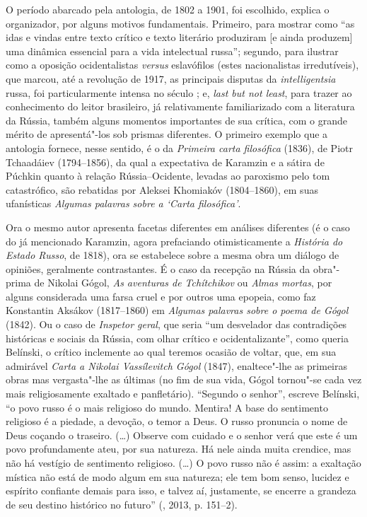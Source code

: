 O período abarcado pela antologia, de 1802 a 1901, foi escolhido, explica o
organizador, por alguns motivos fundamentais. Primeiro, para mostrar como
``as idas e vindas entre texto crítico e texto literário produziram [e ainda produzem] uma dinâmica essencial para a vida intelectual
russa''; segundo, para ilustrar como a oposição ocidentalistas \emph{versus}
eslavófilos (estes nacionalistas irredutíveis), que marcou, até a revolução
de 1917, as principais disputas da \emph{intelligentsia} russa, foi
particularmente intensa no século ; e, \emph{last but not least}, para
trazer ao conhecimento do leitor brasileiro, já relativamente
familiarizado com a literatura da Rússia, também alguns momentos
importantes de sua crítica, com o grande mérito de apresentá"-los sob
prismas diferentes. O primeiro exemplo que a antologia fornece, nesse sentido, é o da \emph{Primeira carta filosófica} (1836), de Piotr Tchaadáiev (1794--1856), da qual a
expectativa de Karamzin e a sátira de Púchkin quanto à relação
Rússia--Ocidente, levadas ao paroxismo pelo tom catastrófico, são
rebatidas por Aleksei Khomiakóv (1804--1860), em suas ufanísticas \emph{Algumas
palavras sobre a `Carta filosófica'}.

Ora o mesmo autor apresenta facetas diferentes em análises diferentes (é o caso do já mencionado Karamzin, agora prefaciando otimisticamente a
\emph{História do Estado Russo}, de 1818), ora se estabelece sobre a
mesma obra um diálogo de opiniões, geralmente contrastantes. É o caso da
recepção na Rússia da obra"-prima de Nikolai Gógol, \emph{As aventuras de Tchítchikov} ou \emph{Almas mortas}, por alguns considerada uma
farsa cruel e por outros uma epopeia, como faz Konstantin Aksákov (1817--1860) em
\emph{Algumas palavras sobre o poema de Gógol} (1842). Ou o caso de \emph{Inspetor geral}, que seria ``um desvelador das contradições históricas e
sociais da Rússia, com olhar crítico e ocidentalizante'', como queria
Belínski, o crítico inclemente ao qual teremos ocasião de
voltar, que, em sua admirável \emph{Carta a Nikolai Vassílevitch Gógol} (1847), enaltece"-lhe as primeiras obras mas vergasta"-lhe as últimas (no fim de sua vida, Gógol tornou"-se cada vez mais religiosamente exaltado
e panfletário). ``Segundo o senhor'', escreve Belínski, ``o povo russo
é o mais religioso do mundo. Mentira! A base do sentimento religioso é a
piedade, a devoção, o temor a Deus. O russo pronuncia o nome de Deus
coçando o traseiro. (\ldots{}) Observe com cuidado e o senhor verá que este é
um povo profundamente ateu, por sua natureza. Há nele ainda muita
crendice, mas não há vestígio de sentimento religioso. (\ldots{}) O povo
russo não é assim: a exaltação mística não está de modo algum em sua
natureza; ele tem bom senso, lucidez e espírito confiante demais para
isso, e talvez aí, justamente, se encerre a grandeza de seu destino
histórico no futuro'' (, 2013, p. 151--2).

